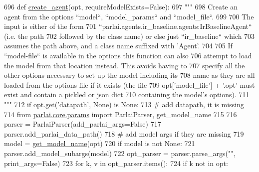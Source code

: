 \begin{DoxyCode}
696 \textcolor{keyword}{def }\hyperlink{namespaceparlai_1_1core_1_1agents_ad0d54074d4bcc148bb415ab5515a53b5}{create\_agent}(opt, requireModelExists=False):
697     \textcolor{stringliteral}{"""}
698 \textcolor{stringliteral}{    Create an agent from the options ``model``, ``model\_params`` and ``model\_file``.}
699 \textcolor{stringliteral}{}
700 \textcolor{stringliteral}{    The input is either of the form}
701 \textcolor{stringliteral}{    ``parlai.agents.ir\_baseline.agents:IrBaselineAgent`` (i.e. the path}
702 \textcolor{stringliteral}{    followed by the class name) or else just ``ir\_baseline`` which}
703 \textcolor{stringliteral}{    assumes the path above, and a class name suffixed with 'Agent'.}
704 \textcolor{stringliteral}{}
705 \textcolor{stringliteral}{    If ``model-file`` is available in the options this function can also}
706 \textcolor{stringliteral}{    attempt to load the model from that location instead. This avoids having to}
707 \textcolor{stringliteral}{    specify all the other options necessary to set up the model including its}
708 \textcolor{stringliteral}{    name as they are all loaded from the options file if it exists (the file}
709 \textcolor{stringliteral}{    opt['model\_file'] + '.opt' must exist and contain a pickled or json dict}
710 \textcolor{stringliteral}{    containing the model's options).}
711 \textcolor{stringliteral}{    """}
712     \textcolor{keywordflow}{if} opt.get(\textcolor{stringliteral}{'datapath'}, \textcolor{keywordtype}{None}) \textcolor{keywordflow}{is} \textcolor{keywordtype}{None}:
713         \textcolor{comment}{# add datapath, it is missing}
714         \textcolor{keyword}{from} \hyperlink{namespaceparlai_1_1core_1_1params}{parlai.core.params} \textcolor{keyword}{import} ParlaiParser, get\_model\_name
715 
716         parser = ParlaiParser(add\_parlai\_args=\textcolor{keyword}{False})
717         parser.add\_parlai\_data\_path()
718         \textcolor{comment}{# add model args if they are missing}
719         model = \hyperlink{namespaceparlai_1_1core_1_1params_a6d160324f6af84562334fd0698141074}{get\_model\_name}(opt)
720         \textcolor{keywordflow}{if} model \textcolor{keywordflow}{is} \textcolor{keywordflow}{not} \textcolor{keywordtype}{None}:
721             parser.add\_model\_subargs(model)
722         opt\_parser = parser.parse\_args(\textcolor{stringliteral}{""}, print\_args=\textcolor{keyword}{False})
723         \textcolor{keywordflow}{for} k, v \textcolor{keywordflow}{in} opt\_parser.items():
724             \textcolor{keywordflow}{if} k \textcolor{keywordflow}{not} \textcolor{keywordflow}{in} opt:

\end{DoxyCode}
